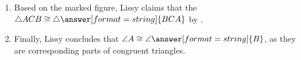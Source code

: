 \documentclass[nooutcomes]{ximera}
\begin{document}
\begin{problem}
\begin{enumerate}
\item Based on the marked figure, Lissy claims that the $\triangle ACB\cong \triangle\answer[format=string]{BCA}$ by . 

\item Finally, Lissy concludes that $\angle A\cong \angle\answer[format=string]{B}$, as they are corresponding parts of congruent triangles. 
\end{enumerate}

\end{problem}
\end{document}
